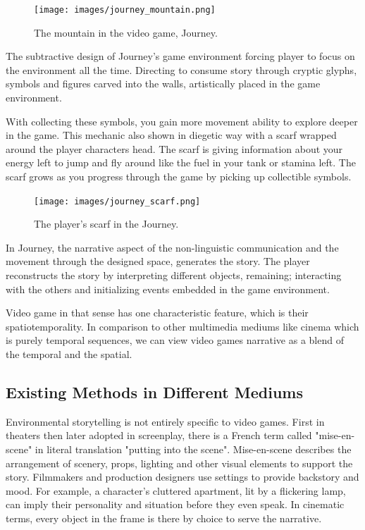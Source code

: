             \begin{figure}[H]
                \centering
                \texttt{[image: images/journey\_mountain.png]}
                \caption{The mountain in the video game, Journey.}
                \label{fig:JOURNEY_MOUNTAIN}
            \end{figure}

            The subtractive design of Journey's game environment forcing player to focus on the environment all the time. Directing to consume story through cryptic glyphs, symbols and figures carved into the walls, artistically placed in the game environment.\par

            With collecting these symbols, you gain more movement ability to explore deeper in the game. This mechanic also shown in diegetic way with a scarf wrapped around the player characters head. The scarf is giving information about your energy left to jump and fly around like the fuel in your tank or stamina left. The scarf grows as you progress through the game by picking up collectible symbols.\par

            \begin{figure}[H]
                \centering
                \texttt{[image: images/journey\_scarf.png]}
                \caption{The player's scarf in the Journey.}
                \label{fig:JOURNEY_SCARF}
            \end{figure}      

            In Journey, the narrative aspect of the non-linguistic communication and the movement through the designed space, generates the story. The player reconstructs the story by interpreting different objects, remaining; interacting with the others and initializing events embedded in the game environment.\par

            Video game in that sense has one characteristic feature, which is their spatiotemporality. In comparison to other multimedia mediums like cinema which is purely temporal sequences, we can view video games narrative as a blend of the temporal and the spatial\cite{Liminal_Space_Between_Embedded_and_Emergent_Narrative}.
            \subsection{Existing Methods in Different Mediums}
            Environmental storytelling is not entirely specific to video games. First in theaters then later adopted in screenplay, there is a French term called "mise-en-scene" in literal translation "putting into the scene". Mise-en-scene describes the arrangement of scenery, props, lighting and other visual elements to support the story. Filmmakers and production designers use settings to provide backstory and mood. For example, a character’s cluttered apartment, lit by a flickering lamp, can imply their personality and situation before they even speak. In cinematic terms, every object in the frame is there by choice to serve the narrative.\cite{Mise_en_scene}\par
        
